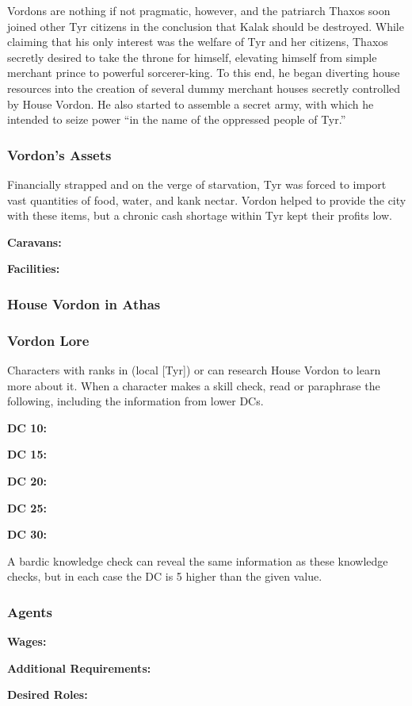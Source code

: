 Vordons are nothing if not pragmatic, however, and the patriarch Thaxos soon joined other Tyr citizens in the conclusion that Kalak should be destroyed. While claiming that his only interest was the welfare of Tyr and her citizens, Thaxos secretly desired to take the throne for himself, elevating himself from simple merchant prince to powerful sorcerer-king. To this end, he began diverting house resources into the creation of several dummy merchant houses secretly controlled by House Vordon. He also started to assemble a secret army, with which he intended to seize power ``in the name of the oppressed people of Tyr.''

\subsubsection{Vordon's Assets}
Financially strapped and on the verge of starvation, Tyr was forced to import vast quantities of food, water, and kank nectar. Vordon helped to provide the city with these items, but a chronic cash shortage within Tyr kept their profits low.

\textbf{Caravans:} 

\textbf{Facilities:} 

\subsubsection{House Vordon in Athas}

\subsubsection{Vordon Lore}
Characters with ranks in  (local [Tyr]) or  can research House Vordon to learn more about it. When a character makes a skill check, read or paraphrase the following, including the information from lower DCs.

\textbf{DC 10:} 

\textbf{DC 15:} 

\textbf{DC 20:} 

\textbf{DC 25:} 

\textbf{DC 30:} 

A bardic knowledge check can reveal the same information as these knowledge checks, but in each case the DC is 5 higher than the given value.

\subsubsection{Agents}


\textbf{Wages:} 

\textbf{Additional Requirements:} 

\textbf{Desired Roles:} 